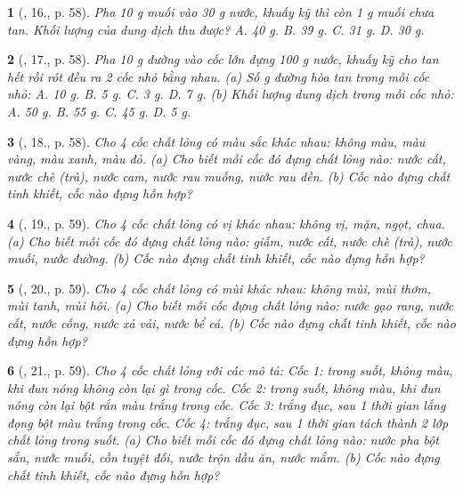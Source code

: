 \documentclass{article}
\newtheorem{baitoan}{}
\begin{document}
\begin{baitoan}[\cite{ncpt_KHTN_6_tap_1}, 16., p. 58]
	Pha {\rm10 g} muối vào {\rm30 g} nước, khuấy kỹ thì còn {\rm1 g} muối chưa tan. Khối lượng của dung dịch thu được? {\sf A.} {\rm40 g}. {\sf B.} {\rm39 g}. {\sf C.} {\rm31 g}. {\sf D.} {\rm30 g}.
\end{baitoan}

\begin{baitoan}[\cite{ncpt_KHTN_6_tap_1}, 17., p. 58]
	Pha {\rm10 g} đường vào cốc lớn đựng {\rm100 g} nước, khuấy kỹ cho tan hết rồi rót đều ra 2 cốc nhỏ bằng nhau. (a) Số {\rm g} đường hòa tan trong mỗi cốc nhỏ: {\sf A.} {\rm10 g}. {\sf B.} {\rm5 g}. {\sf C.} {\rm3 g}. {\sf D.} {\rm7 g}. (b) Khối lượng dung dịch trong mỗi cốc nhỏ: {\sf A.} {\rm50 g}. {\sf B.} {\rm55 g}. {\sf C.} {\rm45 g}. {\sf D.} {\rm5 g}.
\end{baitoan}

\begin{baitoan}[\cite{ncpt_KHTN_6_tap_1}, 18., p. 58]
	Cho 4 cốc chất lỏng có màu sắc khác nhau: không màu, màu vàng, màu xanh, màu đỏ. (a) Cho biết mỗi cốc đó đựng chất lỏng nào: nước cất, nước chè (trà), nước cam, nước rau muống, nước rau dền. (b) Cốc nào đựng chất tinh khiết, cốc nào đựng hỗn hợp?
\end{baitoan}

\begin{baitoan}[\cite{ncpt_KHTN_6_tap_1}, 19., p. 59]
	Cho 4 cốc chất lỏng có vị khác nhau: không vị, mặn, ngọt, chua. (a) Cho biết mỗi cốc đó đựng chất lỏng nào: giấm, nước cất, nước chè (trà), nước muối, nước đường. (b) Cốc nào đựng chất tinh khiết, cốc nào đựng hỗn hợp?
\end{baitoan}

\begin{baitoan}[\cite{ncpt_KHTN_6_tap_1}, 20., p. 59]
	Cho 4 cốc chất lỏng có mùi khác nhau: không mùi, mùi thơm, mùi tanh, mùi hôi. (a) Cho biết mỗi cốc đựng chất lỏng nào: nước gạo rang, nước cất, nước cống, nước xả vải, nước bể cá. (b) Cốc nào đựng chất tinh khiết, cốc nào đựng hỗn hợp?
\end{baitoan}

\begin{baitoan}[\cite{ncpt_KHTN_6_tap_1}, 21., p. 59]
	Cho 4 cốc chất lỏng với các mô tả: Cốc 1: trong suốt, không màu, khi đun nóng không còn lại gì trong cốc. Cốc 2: trong suốt, không màu, khi đun nóng còn lại bột rắn màu trắng trong cốc. Cốc 3: trắng đục, sau 1 thời gian lắng đọng bột màu trắng trong cốc. Cốc 4: trắng đục, sau 1 thời gian tách thành 2 lớp chất lỏng trong suốt. (a) Cho biết mỗi cốc đó đựng chất lỏng nào: nước pha bột sắn, nước muối, cồn tuyệt đối, nước trộn dầu ăn, nước mắm. (b) Cốc nào đựng chất tinh khiết, cốc nào đựng hỗn hợp?
\end{baitoan}
\end{document}
